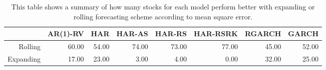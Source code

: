 \begin{table}[ht]
\centering
\begin{tabular}{rrrrrrrr}
  \hline
 & AR(1)-RV & HAR & HAR-AS & HAR-RS & HAR-RSRK & RGARCH & GARCH \\ 
  \hline
Rolling & 60.00 & 54.00 & 74.00 & 73.00 & 77.00 & 45.00 & 52.00 \\ 
  Expanding & 17.00 & 23.00 & 3.00 & 4.00 & 0.00 & 32.00 & 25.00 \\ 
   \hline
\end{tabular}
\caption[Better scheme MSE summary]{This table shows a summary of how many stocks for each model perform better with expanding or rolling forecasting scheme according to mean square error. } 
\label{Table:Better_MSE_summary}
\end{table}
